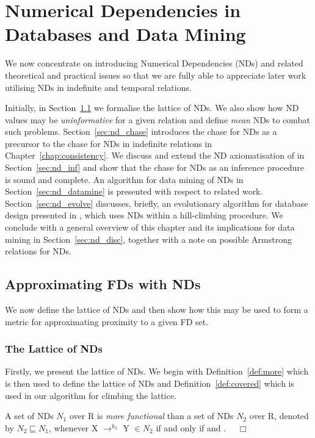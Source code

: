 \chapter{Numerical Dependencies in Databases and Data
Mining}\label{chap:numdep} 

We now concentrate on introducing Numerical Dependencies (NDs) and
related theoretical and practical issues so that we are fully able to
appreciate later work utilising NDs in indefinite and temporal
relations.

\medskip

Initially, in Section~\ref{sec:nd_approx} we formalise the lattice
of NDs. We also show how ND values may be {\em uninformative} for a given
relation and define {\em mean} NDs to combat such
problems. Section~\ref{sec:nd_chase} introduces the chase for NDs as a
precursor to the chase for NDs in indefinite relations in
Chapter~\ref{chap:consistency}. We discuss and extend the ND 
axiomatisation of \cite{gm85a} in Section~\ref{sec:nd_inf}
and show that the chase for NDs as an inference procedure
is sound and complete.
An algorithm for data mining of NDs in
Section~\ref{sec:nd_datamine} is presented with respect to related
work. Section~\ref{sec:nd_evolve} discusses, 
briefly, an evolutionary algorithm for database design presented
in \cite{cl98c}, which uses NDs within a hill-climbing
procedure. We conclude with a general overview of
this chapter and its implications for data mining in
Section~\ref{sec:nd_disc}, together with a note on possible Armstrong
relations for NDs.


\section{Approximating FDs with NDs}\label{sec:nd_approx}
We now define the lattice of NDs and then show how this may be
used to form a metric for approximating proximity to a given FD set. 

\subsection{The Lattice of NDs}
Firstly, we present the lattice of NDs. We begin with
Definition~\ref{def:more} which is then used to define the lattice of
NDs and Definition~\ref{def:covered} which is used in our algorithm
for climbing the lattice.

\begin{definition}\label{def:more}
\begin{rm}
A set of NDs $N_1$ over R is {\em more functional} than a set of NDs 
$N_2$ over R, denoted by $N_2 \sqsubseteq N_1$, whenever
X $\to^{k_2}$ Y $\in N_2$ if and only if \linebreak {} and  
. $\quad\Box$
\end{rm}
\end{definition}

